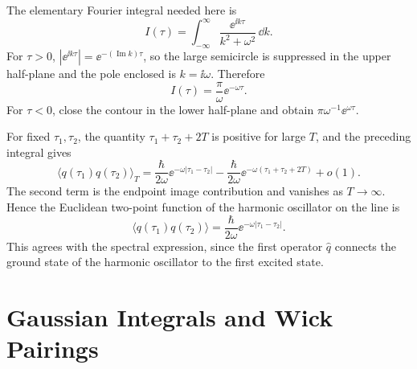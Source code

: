 The elementary Fourier integral needed here is
\[
  I(\tau)
  =
  \int_{-\infty}^{\infty}
  \frac{\ee^{\ii k\tau}}{k^2+\omega^2}\,\dd k .
\]
For \(\tau>0\), \(|\ee^{\ii k\tau}|=\ee^{-(\operatorname{Im}k)\tau}\), so the
large semicircle is suppressed in the upper half-plane and the pole enclosed
is \(k=\ii\omega\).  Therefore
\[
  I(\tau)
  =
  \frac{\pi}{\omega}\ee^{-\omega\tau}.
\]
For \(\tau<0\), close the contour in the lower half-plane and obtain
\(\pi\omega^{-1}\ee^{\omega\tau}\).

\begin{center}
\end{center}

For fixed \(\tau_1,\tau_2\), the quantity \(\tau_1+\tau_2+2T\) is positive for
large \(T\), and the preceding integral gives
\[
  \langle q(\tau_1)q(\tau_2)\rangle_T
  =
  \frac{\hbar}{2\omega}\ee^{-\omega|\tau_1-\tau_2|}
  -
  \frac{\hbar}{2\omega}\ee^{-\omega(\tau_1+\tau_2+2T)}
  +o(1).
\]
The second term is the endpoint image contribution and vanishes as
\(T\to\infty\).  Hence the Euclidean two-point function of the harmonic
oscillator on the line is
\[
  \boxed{
  \langle q(\tau_1)q(\tau_2)\rangle
  =
  \frac{\hbar}{2\omega}
  \ee^{-\omega|\tau_1-\tau_2|}
  }.
\]
This agrees with the spectral expression, since the first operator
\(\widehat q\) connects the ground state of the harmonic oscillator to the
first excited state.

\section{Gaussian Integrals and Wick Pairings}

